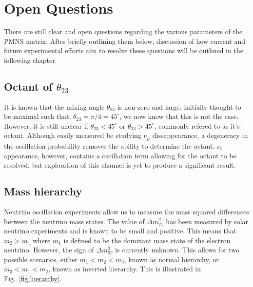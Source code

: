 \section{Open Questions}
\label{sec:theory_questions}

There are still clear and open questions regarding the various parameters of the PMNS matrix.
After briefly outlining them below, discussion of how current and future experimental efforts
aim to resolve these questions will be outlined in the following chapter.

\subsection{Octant of \texorpdfstring{$\theta_{23}$}{}}

It is known that the mixing angle $\theta_{23}$ is non-zero and large. Initially thought to be
maximal such that, $\theta_{23}=\pi/4=45^{\circ}$, we now know that this is not the case.
However, it is still unclear if $\theta_{23}<45^{\circ}$ or $\theta_{23}>45^{\circ}$, commonly
refered to as it's octant. Although easily measured be studying $\nu_{\mu}$ dissappearance, a
degeneracy in the oscillation probability removes the ability to determine the octant. $\nu_{e}$
appearance, however, contains a oscillation term allowing for the octant to be resolved, but
exploration of this channel is yet to produce a significant result.

\subsection{Mass hierarchy}

Neutrino oscillation experiments allow us to measure the mass squared differences between the
neutrino mass states. The value of $\Delta m_{21}^2$ has been measured by solar neutrino
experiments and is known to be small and positive. This means that $m_{2}>m_{1}$ where $m_{1}$ is
defined to be the dominant mass state of the electron neutrino. However, the sign of $\Delta
    m_{32}^2$ is currently unknown. This allows for two possible scenarios, either $m_1<m_2<m_3$,
known as normal hierarchy, or $m_3<m_1<m_2$, known as inverted hierarchy. This is illustrated
in Fig.~\ref{fig:hierarchy}.

